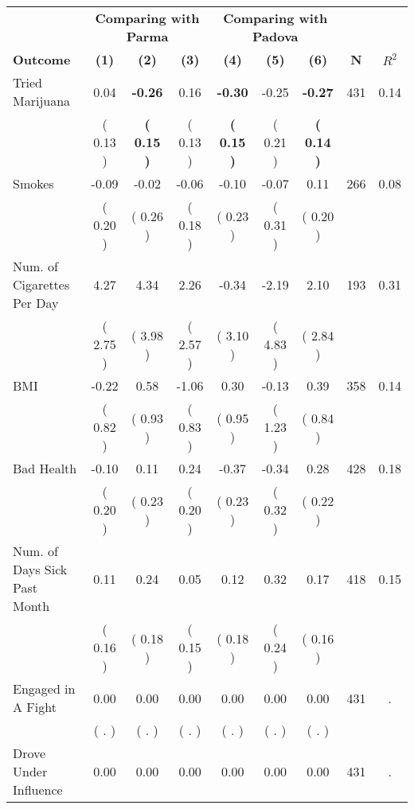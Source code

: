 \begin{tabular}{lcccccccc}
\toprule
 & \multicolumn{3}{c}{\textbf{Comparing with Parma}} & \multicolumn{3}{c}{\textbf{Comparing with Padova}} & \\
\cmidrule(lr){2-4} \cmidrule(lr){5-7} 
 \textbf{Outcome} & \textbf{(1)} & \textbf{(2)} & \textbf{(3)} & \textbf{(4)} & \textbf{(5)} & \textbf{(6)} & \textbf{N} & \textbf{$ R^2$} \\
\midrule
Tried Marijuana &      0.04 & \textbf{    -0.26} &      0.16 & \textbf{    -0.30} &     -0.25 & \textbf{    -0.27} & 431 &       0.14 \\ 
 & (     0.13 ) & \textbf{(     0.15 )} & (     0.13 ) & \textbf{(     0.15 )} & (     0.21 ) & \textbf{(     0.14 )} & \\
Smokes &     -0.09 &     -0.02 &     -0.06 &     -0.10 &     -0.07 &      0.11 & 266 &       0.08 \\ 
 & (     0.20 ) & (     0.26 ) & (     0.18 ) & (     0.23 ) & (     0.31 ) & (     0.20 ) & \\
Num. of Cigarettes Per Day &      4.27 &      4.34 &      2.26 &     -0.34 &     -2.19 &      2.10 & 193 &       0.31 \\ 
 & (     2.75 ) & (     3.98 ) & (     2.57 ) & (     3.10 ) & (     4.83 ) & (     2.84 ) & \\
BMI &     -0.22 &      0.58 &     -1.06 &      0.30 &     -0.13 &      0.39 & 358 &       0.14 \\ 
 & (     0.82 ) & (     0.93 ) & (     0.83 ) & (     0.95 ) & (     1.23 ) & (     0.84 ) & \\
Bad Health &     -0.10 &      0.11 &      0.24 &     -0.37 &     -0.34 &      0.28 & 428 &       0.18 \\ 
 & (     0.20 ) & (     0.23 ) & (     0.20 ) & (     0.23 ) & (     0.32 ) & (     0.22 ) & \\
Num. of Days Sick Past Month &      0.11 &      0.24 &      0.05 &      0.12 &      0.32 &      0.17 & 418 &       0.15 \\ 
 & (     0.16 ) & (     0.18 ) & (     0.15 ) & (     0.18 ) & (     0.24 ) & (     0.16 ) & \\
Engaged in A Fight &      0.00 &      0.00 &      0.00 &      0.00 &      0.00 &      0.00 & 431 &          . \\ 
 & (        . ) & (        . ) & (        . ) & (        . ) & (        . ) & (        . ) & \\
Drove Under Influence &      0.00 &      0.00 &      0.00 &      0.00 &      0.00 &      0.00 & 431 &          . \\ 

\end{tabular}
